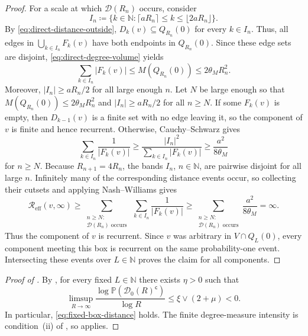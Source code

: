\documentclass[11pt,a4paper]{scrartcl}
\renewcommand{\P}{\mathbb{P}}
\newcommand{\N}{\mathbb{N}}
\newcommand{\1}{\mathbb{1}}
\newcommand{\Reff}{\mathcal{R}_{\mathrm{eff}}}
\begin{document}
\begin{proof}
For a scale at which \(\mathcal D(R_n)\) occurs, consider
\[
  I_n\coloneqq 
  \big\{k\in\N:
    \lceil aR_n\rceil\le k\le\lfloor2aR_n\rfloor
  \big\}.
\]
By \eqref{eq:direct-distance-outside},
\(D_k(v)\subseteq Q_{R_n}(0)\) for every \(k\in I_n\).  Thus, all edges in
\(\bigcup_{k\in I_n}F_k(v)\) have both endpoints in \(Q_{R_n}(0)\).  Since
these edge sets are disjoint, \eqref{eq:direct-degree-volume} yields
\[
  \sum_{k\in I_n}|F_k(v)|
  \le M(Q_{R_n}(0))
  \le 2 \theta_M R_n^2.
\]
Moreover, \(|I_n|\ge aR_n/2\) for all large enough \(n\). Let $N$ be large enough so that $ M(Q_{R_n}(0))\le 2 \theta_M R_n^2$ and \(|I_n|\ge aR_n/2\) for all $n\geq N$.  If some \(F_k(v)\) is
empty, then \(D_{k-1}(v)\) is a finite set with no edge leaving it, so the
component of \(v\) is finite and hence recurrent.  Otherwise,
Cauchy--Schwarz gives
\begin{equation}
\label{eq:direct-resistance-band}
  \sum_{k\in I_n}\frac1{|F_k(v)|}
  \ge
  \frac{|I_n|^2}{\sum_{k\in I_n}|F_k(v)|}
  \ge
  \frac{a^2}{8 \theta_M}
\end{equation}
for $n\geq N$.
Because \(R_{n+1}=4R_n\), the bands \(I_n\), \(n \in \N\), are pairwise disjoint for all
large \(n\).  Infinitely many of the corresponding distance events occur, so
collecting their cutsets and applying Nash--Williams gives
\[
  \Reff(v,\infty)
  \ge
  \sum_{\substack{n \geq N: \\ \mathcal D(R_n)\text{ occurs}}}
  \ \sum_{k\in I_n}\frac1{|F_k(v)|}
  \ge
  \sum_{\substack{n \geq N: \\ \mathcal D(R_n)\text{ occurs}}}
  \frac{a^2}{8 \theta_M}
  =
  \infty.
\]
Thus the component of \(v\) is recurrent. Since $v$ was arbitrary in
\(V\cap Q_L(0)\), every component meeting this box is recurrent on the same
probability-one event. Intersecting these events over \(L\in\N\) proves the
claim for all components.
\end{proof}

\begin{proof}[Proof of ]
By \cite[Theorem~1]{lue2024spatialrandomgraphsweak}, for every fixed
\(L\in\N\) there exists \(\eta>0\) such that
\[
  \limsup_{R\to\infty}
  \frac{\log\P(\mathcal D_0(R)^{\mathsf c})}{\log R}
  \le \xi\vee(2+\mu)<0.
\]
In particular, \eqref{eq:fixed-box-distance} holds.  The finite
degree-measure intensity is condition~(ii) of
, so
 applies.
\end{proof}
\end{document}
